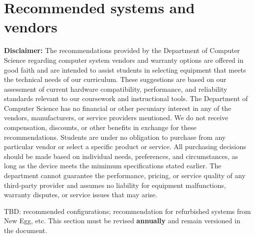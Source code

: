 \section{Recommended systems and vendors}
\begin{spacing}{0.7}
{\small
\textbf{Disclaimer:} The recommendations provided by the Department of Computer Science regarding computer system vendors and warranty options are offered in good faith and are intended to assist students in selecting equipment that meets the technical needs of our curriculum. These suggestions are based on our assessment of current hardware compatibility, performance, and reliability standards relevant to our coursework and instructional tools. The Department of Computer Science has no financial or other pecuniary interest in any of the vendors, manufacturers, or service providers mentioned. We do not receive compensation, discounts, or other benefits in exchange for these recommendations. Students are under no obligation to purchase from any particular vendor or select a specific product or service. All purchasing decisions should be made based on individual needs, preferences, and circumstances, as long as the device meets the mimimum specifications stated earlier. The department cannot guarantee the performance, pricing, or service quality of any third-party provider and assumes no liability for equipment malfunctions, warranty disputes, or service issues that may arise.} %
\end{spacing}\vskip 12pt

{\color{brown}TBD: recommended configurations; recommendation for refurbished systems from New Egg, etc. This section must be revised \textbf{annually} and remain versioned in the document.}